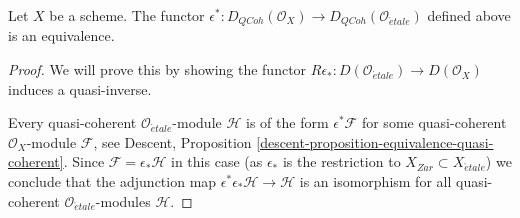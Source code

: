 \begin{lemma}
\label{lemma-derived-quasi-coherent-small-etale-site}
Let $X$ be a scheme. The functor
$\epsilon^* : D_{QCoh}(\mathcal{O}_X) \to
D_{QCoh}(\mathcal{O}_{\acute{e}tale})$
defined above is an equivalence.
\end{lemma}

\begin{proof}
We will prove this by showing the functor
$R\epsilon_* : D(\mathcal{O}_{\acute{e}tale}) \to D(\mathcal{O}_X)$
induces a quasi-inverse.

\medskip\noindent
Every quasi-coherent $\mathcal{O}_{\acute{e}tale}$-module
$\mathcal{H}$ is of the form $\epsilon^*\mathcal{F}$ for some quasi-coherent
$\mathcal{O}_X$-module $\mathcal{F}$, see
Descent, Proposition \ref{descent-proposition-equivalence-quasi-coherent}.
Since $\mathcal{F} = \epsilon_*\mathcal{H}$ in this case
(as $\epsilon_*$ is the restriction to $X_{Zar} \subset X_{\acute{e}tale}$)
we conclude that the adjunction map
$\epsilon^*\epsilon_*\mathcal{H} \to \mathcal{H}$ is an isomorphism for all
quasi-coherent $\mathcal{O}_{\acute{e}tale}$-modules $\mathcal{H}$.


\end{proof}
